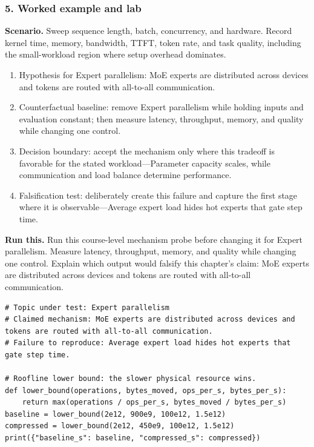 \subsubsection*{5. Worked example and lab}
\textbf{Scenario.} Sweep sequence length, batch, concurrency, and hardware. Record kernel time, memory, bandwidth, TTFT, token rate, and task quality, including the small-workload region where setup overhead dominates.
\begin{enumerate}
\item Hypothesis for Expert parallelism: MoE experts are distributed across devices and tokens are routed with all-to-all communication.
\item Counterfactual baseline: remove Expert parallelism while holding inputs and evaluation constant; then measure latency, throughput, memory, and quality while changing one control.
\item Decision boundary: accept the mechanism only where this tradeoff is favorable for the stated workload—Parameter capacity scales, while communication and load balance determine performance.
\item Falsification test: deliberately create this failure and capture the first stage where it is observable—Average expert load hides hot experts that gate step time.
\end{enumerate}
\textbf{Run this.} Run this course-level mechanism probe before changing it for Expert parallelism. Measure latency, throughput, memory, and quality while changing one control. Explain which output would falsify this chapter's claim: MoE experts are distributed across devices and tokens are routed with all-to-all communication.
\begin{Verbatim}[fontsize=\scriptsize]
# Topic under test: Expert parallelism
# Claimed mechanism: MoE experts are distributed across devices and tokens are routed with all-to-all communication.
# Failure to reproduce: Average expert load hides hot experts that gate step time.

# Roofline lower bound: the slower physical resource wins.
def lower_bound(operations, bytes_moved, ops_per_s, bytes_per_s):
    return max(operations / ops_per_s, bytes_moved / bytes_per_s)
baseline = lower_bound(2e12, 900e9, 100e12, 1.5e12)
compressed = lower_bound(2e12, 450e9, 100e12, 1.5e12)
print({"baseline_s": baseline, "compressed_s": compressed})
\end{Verbatim}
